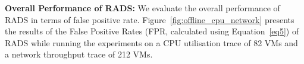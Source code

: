\textbf{Overall Performance of RADS:}
We evaluate the overall performance of RADS in terms of false positive rate. 
Figure~\ref{fig:offline_cpu_network} presents the results of the False Positive Rates (FPR, calculated using Equation~\ref{eq5}) of RADS while running the experiments on a CPU utilisation trace of 82 VMs and a network throughput trace of 212 VMs.
